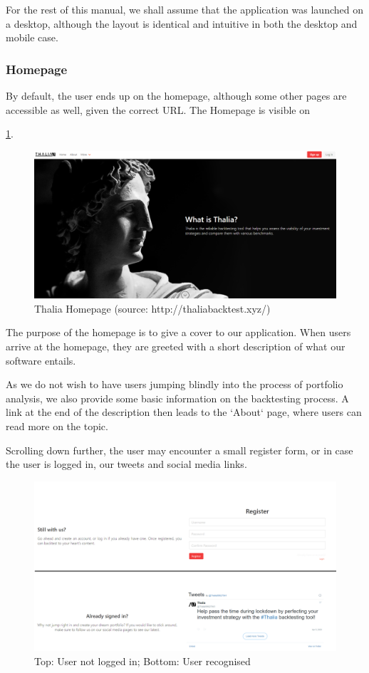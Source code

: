 \documentclass[main.tex]{subfiles}
\begin{document}
For the rest of this manual, we shall assume that the application was launched on a desktop, although the layout is identical and intuitive in both the desktop and mobile case. 

\subsubsection{Homepage}
By default, the user ends up on the homepage, although some other pages are accessible as well, given the correct URL. The Homepage is visible on 

\figurename{\ref{thalia_home}}.
\begin{figure}[H]
   \centering
   \includegraphics[width=\textwidth]{08Appendices/081User/081Pictures/homepage.png}
   \caption{Thalia Homepage (source: http://thaliabacktest.xyz/)}
   \label{thalia_home}
\end{figure}

The purpose of the homepage is to give a cover to our application. When users arrive at the homepage, they are greeted with a short description of what our software entails.

As we do not wish to have users jumping blindly into the process of portfolio analysis, we also provide some basic information on the backtesting process. A link at the end of the description then leads to the `About` page, where users can read more on the topic.

Scrolling down further, the user may encounter a small register form, or in case the user is logged in, our tweets and social media links.

\begin{figure}[H]
   \centering
   \includegraphics[width=\textwidth]{08Appendices/081User/081Pictures/homepage_bottom.png}
   \caption{Top: User not logged in; Bottom: User recognised}
   \label{thalia_home_bottom}
\end{figure}
\end{document}

